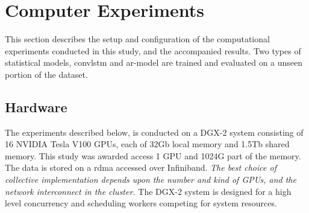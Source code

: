 \section{Computer Experiments} \label{ch:computer_experiments}
This section describes the setup and configuration of the computational experiments conducted in this study, and the accompanied results. Two types of statistical models, \acrshort{convlstm} and \acrshort{ar}-model are trained and evaluated on a unseen portion of the dataset. 

\subsection{Hardware} \label{sec:hardware}
The experiments described below, is conducted on a 
DGX-2 system consisting of 16 NVIDIA Tesla V100 GPUs, each of 32Gb local memory and 1.5Tb shared memory. %
This study was awarded access 1 GPU and 1024G part of the memory. The data is stored on a \acrfull{rdma} accessed over Infiniband. \textit{The best choice of collective implementation depends upon the number and kind of GPUs, and the network interconnect in the cluster.} The DGX-2 system is designed for a high level concurrency and scheduling workers competing for system resources.
